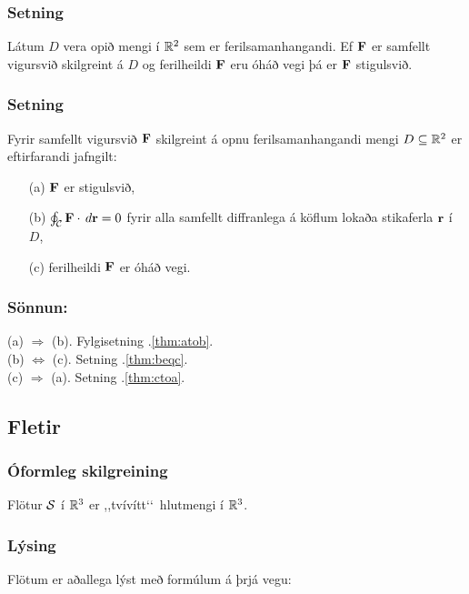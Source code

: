 \subsubsection{ Setning  }
 Látum $D$ vera opið mengi í ${\mathbb R}^2$ sem er ferilsamanhangandi.  Ef $\mbox{${\bf F}$}$ er samfellt vigursvið skilgreint á $D$ og ferilheildi $\mbox{${\bf F}$}$ eru óháð vegi þá er $\mbox{${\bf F}$}$ stigulsvið.
    



\subsubsection{Setning \rtask{}}
 Fyrir samfellt vigursvið $\mbox{${\bf F}$}$ skilgreint á opnu 
ferilsamanhangandi mengi $D\subseteq {\mathbb R}^2$ er eftirfarandi jafngilt:
\begin{itemize}
 \item [(a)] $\mbox{${\bf F}$}$ er stigulsvið,
 \item [(b)]  $\oint_{\cal C} \mbox{${\bf F}$}\cdot\,d\mbox{${\bf r}$}=0$ fyrir alla samfellt diffranlega
á köflum lokaða stikaferla $\mbox{${\bf r}$}$ í $D$, 
\item [(c)] ferilheildi $\mbox{${\bf F}$}$ er óháð vegi.
\end{itemize}

\pause
\subsubsection{Sönnun: } 
(a) $\Rightarrow$ (b). Fylgisetning \kaflanr.\ref{thm:atob}. \\
(b) $\Leftrightarrow$ (c). Setning \kaflanr.\ref{thm:beqc}. \\
(c) $\Rightarrow$ (a). Setning \kaflanr.\ref{thm:ctoa}.
 




\subsection{Fletir} 

\subsubsection{Óformleg skilgreining  \rtask{}}
Flötur $\cal S$ í ${\mathbb R}^3$ er
,,tvívítt\lq\lq\ hlutmengi í ${\mathbb R}^3$.   



\subsubsection{Lýsing  \rtask{}}
Flötum er aðallega lýst með formúlum á þrjá vegu:

